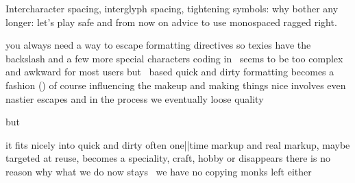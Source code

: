     \FlushStep

\stoptopic

\StopSteps

\StartSteps

\starttopic[title=Justification]

    \FlushStep


    \FlushStep

    \blank

    Intercharacter spacing, interglyph spacing, tightening symbols: why bother
    any longer: let's play safe and from now on advice to use monospaced ragged
    right.

    \FlushStep

\stoptopic

\StopSteps

\StartSteps

\starttopic[title=Backslashes]

    \FlushStep

    \startitemize
        \startitem you always need a way to escape formatting directives \FlushStep \stopitem
        \startitem so texies have the backslash and a few more special characters \FlushStep \stopitem
        \startitem coding in \XML\ seems to be too complex and awkward for most users \FlushStep \stopitem
        \startitem but \ASCII\ based quick and dirty formatting becomes a fashion () \FlushStep \stopitem
        \startitem of course influencing the makeup and making things nice involves even nastier escapes \FlushStep \stopitem
        \startitem and in the process we eventually loose quality \FlushStep \stopitem
    \stopitemize

    but \FlushStep

    \startitemize
        \startitem it fits nicely into quick and dirty often one||time markup \FlushStep \stopitem
        \startitem and real markup, maybe targeted at reuse, becomes a speciality, craft, hobby or disappears \FlushStep \stopitem
        \startitem there is no reason why what we do now stays \unknown\ we have no copying monks left either \FlushStep \stopitem
    \stopitemize

\stoptopic

\StopSteps

\StartSteps

\starttopic[title=Endangered features]

